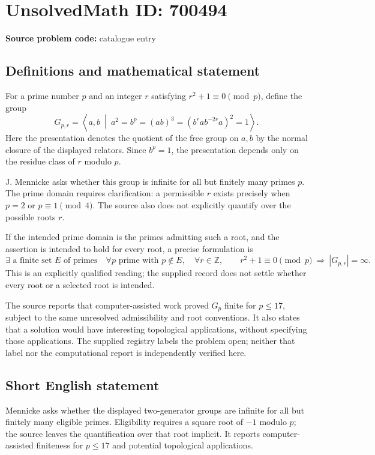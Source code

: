 \documentclass[11pt]{article}
\newcommand{\Z}{\mathbb{Z}}
\begin{document}
\section*{UnsolvedMath ID: 700494}
\textbf{Source problem code:} catalogue entry
\subsection{Definitions and mathematical statement}
For a prime number \(p\) and an integer \(r\) satisfying \(r^2+1\equiv0\pmod p\), define the group
\[
G_{p,r}=\left\langle a,b\ \middle|\ a^2=b^p=(ab)^3=(b^r a b^{-2r}a)^2=1\right\rangle.
\]
Here the presentation denotes the quotient of the free group on \(a,b\) by the normal closure of the displayed relators. Since \(b^p=1\), the presentation depends only on the residue class of \(r\) modulo \(p\).

J. Mennicke asks whether this group is infinite for all but finitely many primes \(p\). The prime domain requires clarification: a permissible \(r\) exists precisely when \(p=2\) or \(p\equiv1\pmod4\). The source also does not explicitly quantify over the possible roots \(r\).

If the intended prime domain is the primes admitting such a root, and the assertion is intended to hold for every root, a precise formulation is
\[
\exists\text{ a finite set }E\text{ of primes}\quad
\forall p\text{ prime with }p\notin E,\quad
\forall r\in\Z,\qquad
r^2+1\equiv0\pmod p\ \Longrightarrow\ |G_{p,r}|=\infty.
\]
This is an explicitly qualified reading; the supplied record does not settle whether every root or a selected root is intended.

The source reports that computer-assisted work proved \(G_p\) finite for \(p\leq17\), subject to the same unresolved admissibility and root conventions. It also states that a solution would have interesting topological applications, without specifying those applications. The supplied registry labels the problem open; neither that label nor the computational report is independently verified here.
\subsection{Short English statement}
Mennicke asks whether the displayed two-generator groups are infinite for all but finitely many eligible primes. Eligibility requires a square root of \(-1\) modulo \(p\); the source leaves the quantification over that root implicit. It reports computer-assisted finiteness for \(p\leq17\) and potential topological applications.
\end{document}
